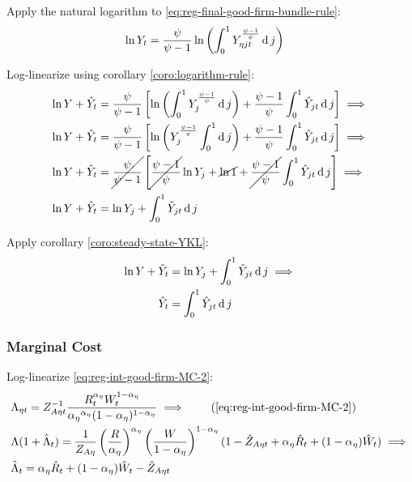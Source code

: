 \documentclass[
	thesis.tex
	]{subfiles}
\begin{document}
Apply the natural logarithm to \ref{eq:reg-final-good-firm-bundle-rule}:
\begin{align}
	\ln Y_t &= \frac{\psi}{\psi-1} \ln \left( \int_{0}^{1} Y_{\eta jt}^{\frac{\psi-1}{\psi}} \operatorname{d} j \right) \nonumber
\end{align}

Log-linearize using corollary \ref{coro:logarithm-rule}:
\begin{align}
	\ln Y + \hat{Y}_t &= \frac{\psi}{\psi-1} \left[ \ln \left( \int_{0}^{1} Y_{j}^{\frac{\psi-1}{\psi}} \operatorname{d} j \right) + \frac{\psi-1}{\psi} \int_{0}^{1} \hat{Y}_{jt} \operatorname{d} j \right] \implies \nonumber
	\\
	\ln Y + \hat{Y}_t &= \frac{\psi}{\psi-1} \left[ \ln \left( Y_{j}^{\frac{\psi-1}{\psi}} \int_{0}^{1} \operatorname{d} j \right) + \frac{\psi-1}{\psi} \int_{0}^{1} \hat{Y}_{jt} \operatorname{d} j \right] \implies \nonumber
	\\
	\ln Y + \hat{Y}_t &= \cancel{\frac{\psi}{\psi-1}} \left[ \cancel{\frac{\psi-1}{\psi}} \ln Y_{j} + \cancel{\ln1} + \cancel{\frac{\psi-1}{\psi}} \int_{0}^{1} \hat{Y}_{jt} \operatorname{d} j \right] \implies \nonumber
	\\
	\ln Y + \hat{Y}_t &= \ln Y_{j} + \int_{0}^{1} \hat{Y}_{jt} \operatorname{d} j \nonumber
\end{align}

Apply corollary \ref{coro:steady-state-YKL}:
\begin{align}
	\ln Y + \hat{Y}_t &= \ln Y_{j} + \int_{0}^{1} \hat{Y}_{jt} \operatorname{d} j \implies \nonumber \\
	\hat{Y}_t &= \int_{0}^{1} \hat{Y}_{jt} \operatorname{d} j 
	\label{eq:reg-ll-final-good-firm-bundle-rule}
\end{align}


\subsubsection{Marginal Cost}

Log-linearize \ref{eq:reg-int-good-firm-MC-2}:
\begin{alignat}{2}
	& \Lambda_{\eta t} = Z_{A\eta t}^{-1} \frac{R_t^{{\alpha_\eta}} W_t^{1-{\alpha_\eta}} }{ {\alpha_\eta}^{{\alpha_\eta}} (1-{\alpha_\eta})^{1-{\alpha_\eta}} } \implies \tag{\ref{eq:reg-int-good-firm-MC-2}} \\
	& \Lambda (1+ \hat{\Lambda}_t) = \frac{1}{Z_{A\eta}} \left( \frac{R}{{\alpha_\eta}} \right)^{{\alpha_\eta}} \left( \frac{W}{1-{\alpha_\eta}} \right)^{1-{\alpha_\eta}} (1- \hat{Z}_{A\eta t} + {\alpha_\eta} \hat{R}_t + (1- {\alpha_\eta}) \hat{W}_t ) \implies \nonumber \\
	& \hat{\Lambda}_t = {\alpha_\eta} \hat{R}_t + (1- {\alpha_\eta}) \hat{W}_t - \hat{Z}_{A\eta t} \label{eq:reg-ll-int-good-firm-MC-2}
\end{alignat}
\end{document}
